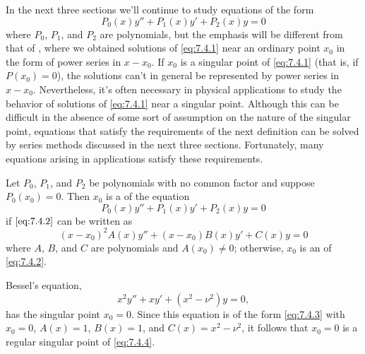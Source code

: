 \noindent
In the next three sections we'll continue to study  equations of
the form
\begin{equation}\label{eq:7.4.1}
P_0(x)y''+P_1(x)y'+P_2(x)y=0
\end{equation}
where $P_0$, $P_1$, and $P_2$ are polynomials, but the emphasis will
be different from that of ,
where we
obtained solutions of \eqref{eq:7.4.1} near an ordinary point $x_0$ in the
form of power series in $x-x_0$. If $x_0$ is a singular point of
\eqref{eq:7.4.1} (that is, if $P(x_0)=0$),  the solutions can't in
general be represented by power series in $x-x_0$. Nevertheless, it's
often necessary in physical applications to study the behavior of
solutions of \eqref{eq:7.4.1} near a singular point. Although this can be
difficult in the absence of some sort of assumption on the nature of
the singular point, equations that satisfy the requirements of the
next definition can be solved by series methods discussed in the
next three sections. Fortunately, many equations arising in
applications satisfy these requirements.

\begin{definition}\label{thmtype:7.4.1}
Let $P_0$, $P_1$, and $P_2$ be polynomials with no common factor and
suppose  $P_0(x_0)=0$. Then $x_0$ is a  of the equation
\begin{equation} \label{eq:7.4.2}
P_0(x)y''+P_1(x)y'+P_2(x)y=0
\end{equation}
if $\eqref{eq:7.4.2}$ can be written as
\begin{equation} \label{eq:7.4.3}
(x-x_0)^2A(x)y''+(x-x_0)B(x)y'+C(x)y=0
\end{equation}
where $A$, $B$, and $C$ are polynomials and $A(x_0)\ne0$;   otherwise,
$x_0$ is an  of \eqref{eq:7.4.2}.
\end{definition}

\begin{example}\label{example:7.4.1}
Bessel's equation,
\begin{equation} \label{eq:7.4.4}
x^2y''+xy'+(x^2-\nu^2)y=0,
\end{equation}
has the singular point $x_0=0$. Since this equation is of the form
\eqref{eq:7.4.3} with $x_0=0$, $A(x)=1$, $B(x)=1$, and $C(x)=x^2-\nu^2$,
it follows that $x_0=0$ is a regular singular point of
\eqref{eq:7.4.4}.
 \end{example}


